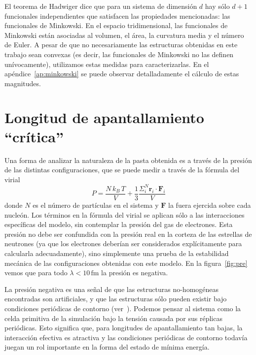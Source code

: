 El teorema de Hadwiger dice que para un sistema de dimensión $d$ hay sólo $d+1$ funcionales independientes que satisfacen las propiedades mencionadas: las funcionales de Minkowski.
En el espacio tridimensional, las funcionales de Minkowski están asociadas al volumen, el área, la curvatura media y el número de Euler.
A pesar de que no necesariamente las estructuras obtenidas en este trabajo sean convexas (es decir, las funcionales de Minkowski no las definen unívocamente), utilizamos estas medidas para caracterizarlas.
En el apéndice~\ref{ap:minkowski} se puede observar detalladamente el cálculo de estas magnitudes.

\section{Longitud de apantallamiento ``crítica''}\label{lambda_c}

Una forma de analizar la naturaleza de la pasta obtenida es a través de la presión de las distintas configuraciones, que se puede medir a través de la fórmula del virial
\begin{equation*}
P=\frac{N\,k_B\,T}{V} + \frac{1}{3}
\frac{\Sigma_{i}^{N}\mathbf{r}_i\cdot\mathbf{F}_i}{V}
\end{equation*}
donde $N$ es el número de partículas en el sistema y $\mathbf{F}$ la fuera ejercida sobre cada nucleón.
Los términos en la fórmula del virial se aplican sólo a las interacciones específicas del modelo, sin contemplar la presión del gas de electrones.
Esta presión no debe ser confundida con la presión real en la corteza de las estrellas de neutrones (ya que los electrones deberían ser considerados explícitamente para calcularla adecuadamente), sino simplemente una prueba de la estabilidad mecánica de las configuraciones obtenidas con este modelo.
En la figura~\ref{fig:pre} vemos que para todo $\lambda<10\,\text{fm}$ la presión es negativa.

La presión negativa es una señal de que las estructuras no-homogéneas encontradas son artificiales, y que las estructuras sólo pueden existir bajo condiciones periódicas de contorno (ver~\cite{binder_beyond_2012,gimenez_molinelli_simulations_2014}).
Podemos pensar al sistema como la celda primitiva de la simulación bajo la tensión causada por sus réplicas periódicas.
Esto significa que, para longitudes de apantallamiento tan bajas, la interacción efectiva es atractiva y las condiciones periódicas de contorno todavía juegan un rol importante en la forma del estado de mínima energía.

